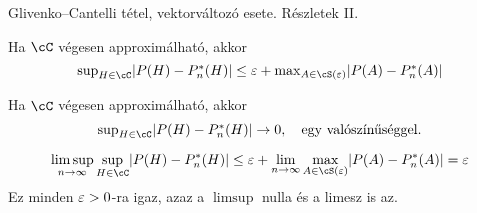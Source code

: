 \documentclass[aspectratio=169,notheorems,9pt,\option]{beamer}
\begin{document}
\begin{frame}{Glivenko--Cantelli tétel, vektorváltozó esete. Részletek II.}
  \begin{proposition}
    Ha $\cC$ végesen approximálható, akkor
    \begin{displaymath}\textstyle
      \sup_{H\in\cC}\abs*{P (H)-P^*_n (H)}\leq
      \eps + \max_{A\in\cS (\eps)}  \abs*{P(A)-P^*_n (A)}
    \end{displaymath}
  \end{proposition}
  \begin{corollary}
    Ha $\cC$ végesen approximálható, akkor
    \begin{displaymath}\textstyle
      \sup_{H\in\cC}\abs*{P(H)-P^*_n (H)} %
    \to0,\quad\text{egy valószínűséggel.}
    \end{displaymath}
  \end{corollary}
  \begin{displaymath}
    \limsup_{n\to\infty}\sup_{H\in\cC}\abs*{P (H)-P^*_n (H)}
    \leq \eps+\lim_{n\to\infty}\max_{A\in\cS (\eps)}  \abs*{P (A)-P^*_n (A)}=\eps
  \end{displaymath}
  Ez minden $\varepsilon>0$-ra igaz, azaz a $\limsup$ nulla és a limesz is az.
\end{frame}
\end{document}
